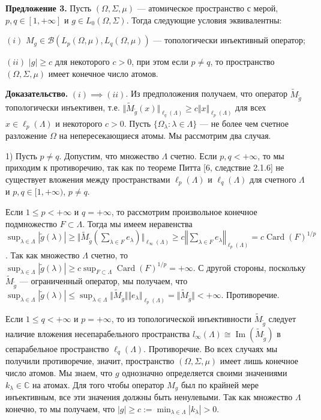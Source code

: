 \documentclass[11pt,twoside]{article}
\begin{document}
\textbf{Предложение 3.} Пусть $(\Omega,\Sigma,\mu)$ --- атомическое пространство с мерой, $p,q\in[1,+\infty]$ и $g\in L_0(\Omega,\Sigma)$. Тогда следующие условия эквивалентны:

$(i)$ $M_g\in\mathcal{B}(L_p(\Omega,\mu),L_q(\Omega,\mu))$ --- топологически инъективный оператор;

$(ii)$ $|g|\geq c$ для некоторого $c>0$, при этом если $p\neq q$, то пространство $(\Omega,\Sigma,\mu)$ имеет конечное число атомов.


\textbf{Доказательство.} $(i)$$\implies$$(ii)$. Из предположения получаем, что оператор $\widetilde{M}_{\widetilde{g}}$ топологически инъективен, т.е. $\Vert\widetilde{M}_{\widetilde{g}}(x)\Vert_{\ell_q(\Lambda)}\geq c\Vert x\Vert_{\ell_p(\Lambda)}$ для всех $x\in\ell_p(\Lambda)$ и некоторого $c>0$. Пусть $\{\Omega_\lambda:\lambda\in\Lambda\}$ --- не более чем счетное разложение $\Omega$ на непересекающиеся атомы. Мы рассмотрим два случая.

1) Пусть $p\neq q$. Допустим, что множество $\Lambda$ счетно. Если $p,q<+\infty$, то мы приходим к противоречию, так как по теореме Питта [6, следствие 2.1.6] не существует вложения между пространствами $\ell_p(\Lambda)$ и $\ell_q(\Lambda)$ для счетного $\Lambda$ и $p,q\in[1,+\infty)$, $p\neq q$. 

Если $1\leq p<+\infty$ и $q=+\infty$, то рассмотрим произвольное конечное подмножество $F\subset\Lambda$. Тогда мы имеем неравенства $
\sup_{\lambda\in\Lambda}|\widetilde{g}(\lambda)|
\geq\Vert\widetilde{M}_{\widetilde{g}}\left(\sum\nolimits_{\lambda\in F}e_\lambda\right)\Vert_{\ell_\infty(\Lambda)}
\geq c\left\Vert\sum\nolimits_{\lambda\in F}e_\lambda\right\Vert_{\ell_p(\Lambda)}
=c\operatorname{Card}(F)^{1/p}$. Так как множество $\Lambda$ счетно, то $\sup_{\lambda\in\Lambda}|\widetilde{g}(\lambda)|\geq c\sup_{F\subset\Lambda}\operatorname{Card}(F)^{1/p}=+\infty$. С другой стороны, поскольку $\widetilde{M}_{\widetilde{g}}$ --- ограниченный оператор, мы получаем, что $\sup_{\lambda\in\Lambda}|\widetilde{g}(\lambda)|
\leq\sup_{\lambda\in\Lambda}\Vert\widetilde{M}_{\widetilde{g}}\Vert\Vert e_\lambda\Vert_{\ell_p(\Lambda)}
=\Vert\widetilde{M}_{\widetilde{g}}\Vert<+\infty$. Противоречие. 

Если $1\leq q<+\infty$ и $p=+\infty$, то из топологической инъективности $\widetilde{M}_{\widetilde{g}}$ следует наличие вложения несепарабельного пространства $l_\infty(\Lambda)\cong\operatorname{Im}(\widetilde{M}_{\widetilde{g}})$ в сепарабельное пространство $\ell_q(\Lambda)$. Противоречие. Во всех случаях мы получили противоречие, значит, пространство $(\Omega,\Sigma,\mu)$ имеет лишь конечное число атомов. Мы знаем, что $g$ однозначно определяется своими значениями $k_\lambda\in\mathbb{C}$ на атомах. Для того чтобы оператор $M_g$ был по крайней мере инъективным, все эти значения должны быть ненулевыми. Так как множество $\Lambda$ конечно, то мы получаем, что $|g|\geq c:=\min_{\lambda\in\Lambda}|k_\lambda|>0$. 
\end{document}

